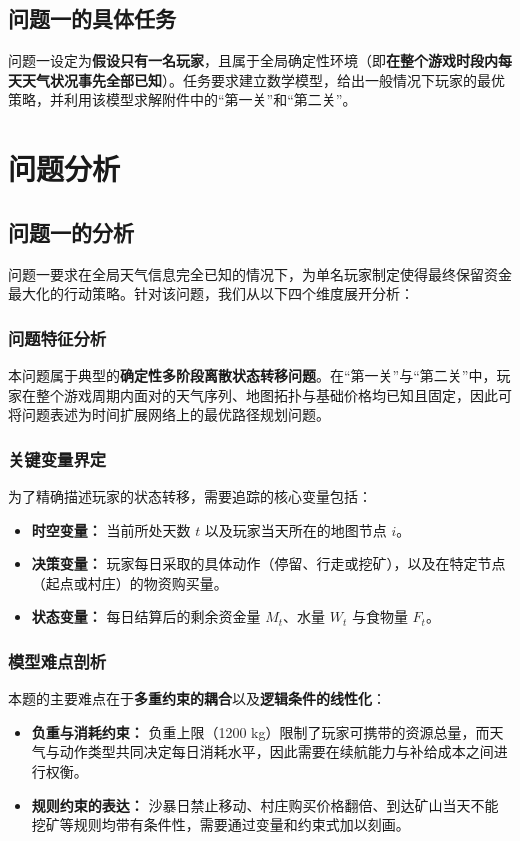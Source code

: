 \documentclass[UTF8,a4paper,12pt]{ctexart}
\begin{document}
\subsection{问题一的具体任务}
问题一设定为\textbf{假设只有一名玩家}，且属于全局确定性环境（即\textbf{在整个游戏时段内每天天气状况事先全部已知}）。任务要求建立数学模型，给出一般情况下玩家的最优策略，并利用该模型求解附件中的“第一关”和“第二关”。
\section{问题分析}

\subsection{问题一的分析}
问题一要求在全局天气信息完全已知的情况下，为单名玩家制定使得最终保留资金最大化的行动策略。针对该问题，我们从以下四个维度展开分析：

\subsubsection{问题特征分析}
本问题属于典型的\textbf{确定性多阶段离散状态转移问题}。在“第一关”与“第二关”中，玩家在整个游戏周期内面对的天气序列、地图拓扑与基础价格均已知且固定，因此可将问题表述为时间扩展网络上的最优路径规划问题。

\subsubsection{关键变量界定}
为了精确描述玩家的状态转移，需要追踪的核心变量包括：
\begin{itemize}
    \item \textbf{时空变量：} 当前所处天数 $t$ 以及玩家当天所在的地图节点 $i$。
    \item \textbf{决策变量：} 玩家每日采取的具体动作（停留、行走或挖矿），以及在特定节点（起点或村庄）的物资购买量。
    \item \textbf{状态变量：} 每日结算后的剩余资金量 $M_t$、水量 $W_t$ 与食物量 $F_t$。
\end{itemize}

\subsubsection{模型难点剖析}
本题的主要难点在于\textbf{多重约束的耦合}以及\textbf{逻辑条件的线性化}：
\begin{itemize}
    \item \textbf{负重与消耗约束：} 负重上限（1200 kg）限制了玩家可携带的资源总量，而天气与动作类型共同决定每日消耗水平，因此需要在续航能力与补给成本之间进行权衡。
    \item \textbf{规则约束的表达：} 沙暴日禁止移动、村庄购买价格翻倍、到达矿山当天不能挖矿等规则均带有条件性，需要通过变量和约束式加以刻画。
\end{itemize}
\end{document}
